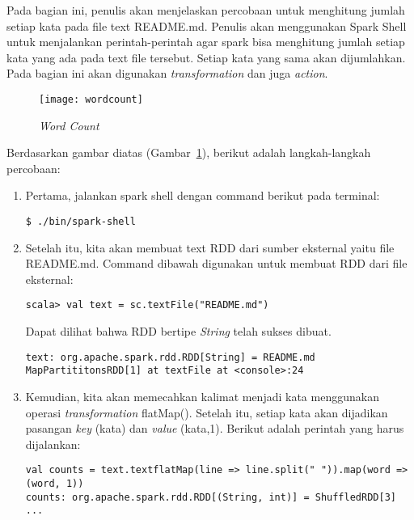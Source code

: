 Pada bagian ini, penulis akan menjelaskan percobaan untuk menghitung jumlah setiap kata pada file text README.md. Penulis akan menggunakan Spark Shell untuk menjalankan perintah-perintah agar spark bisa menghitung jumlah setiap kata yang ada pada text file tersebut. Setiap kata yang sama akan dijumlahkan. Pada bagian ini akan digunakan \textit{transformation} dan juga \textit{action}.

\begin{figure}[H]
    \centering  
    \texttt{[image: wordcount]}  
    \caption[{\it Word Count} ]{{\it Word Count}} 
    \label{fig:wordcount} 
\end{figure}

Berdasarkan gambar diatas (Gambar~\ref{fig:wordcount}), berikut adalah langkah-langkah percobaan:

\begin{enumerate}

\item Pertama, jalankan spark shell dengan command berikut pada terminal:

\begin{verbatim}
$ ./bin/spark-shell
\end{verbatim}

\item Setelah itu, kita akan membuat text RDD dari sumber eksternal yaitu file README.md. Command dibawah digunakan untuk membuat RDD dari file eksternal:

\begin{verbatim}
scala> val text = sc.textFile("README.md") 
\end{verbatim}

Dapat dilihat bahwa RDD bertipe \textit{String} telah sukses dibuat.

\begin{verbatim}
text: org.apache.spark.rdd.RDD[String] = README.md MapPartititonsRDD[1] at textFile at <console>:24
\end{verbatim}


\item Kemudian, kita akan memecahkan kalimat menjadi kata menggunakan operasi \textit{transformation} flatMap(). Setelah itu, setiap kata akan dijadikan pasangan \textit{key} (kata) dan \textit{value} (kata,1). Berikut adalah perintah yang harus dijalankan:

\begin{verbatim}
val counts = text.textflatMap(line => line.split(" ")).map(word => (word, 1))
counts: org.apache.spark.rdd.RDD[(String, int)] = ShuffledRDD[3] ...
\end{verbatim}


\end{enumerate}
